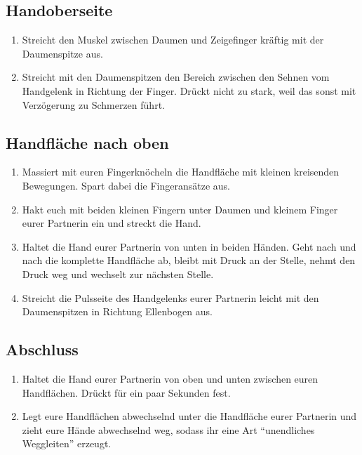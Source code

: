 \subsection{Handoberseite}
\begin{enumerate}
  \item {} Streicht den Muskel zwischen Daumen und Zeigefinger kräftig mit der Daumenspitze aus.
  \item {} Streicht mit den Daumenspitzen  den Bereich zwischen den Sehnen vom Handgelenk in Richtung der Finger. Drückt nicht zu stark, weil das sonst mit Verzögerung zu Schmerzen führt.
\end{enumerate}
\pagebreak

\subsection{Handfläche nach oben}
\begin{enumerate}
  \item {} Massiert mit euren Fingerknöcheln die Handfläche mit kleinen kreisenden Bewegungen. Spart dabei die Fingeransätze aus.
  \item {} Hakt euch mit beiden kleinen Fingern unter Daumen und kleinem Finger eurer Partnerin ein und streckt die Hand.
  \item {} Haltet die Hand eurer Partnerin von unten in beiden Händen. Geht nach und nach die komplette Handfläche ab, bleibt mit Druck an der Stelle, nehmt den Druck weg und wechselt zur nächsten Stelle.
  \item {} Streicht die Pulsseite des Handgelenks eurer Partnerin leicht mit den Daumenspitzen in Richtung Ellenbogen aus.
\end{enumerate}

\subsection{Abschluss}
\begin{enumerate}
  \item {} Haltet die Hand eurer Partnerin von oben und unten zwischen euren Handflächen. Drückt für ein paar Sekunden fest.
  \item {} Legt eure Handflächen abwechselnd unter die Handfläche eurer Partnerin und zieht eure Hände abwechselnd weg, sodass ihr eine Art "`unendliches Weggleiten"' erzeugt.
\end{enumerate}
